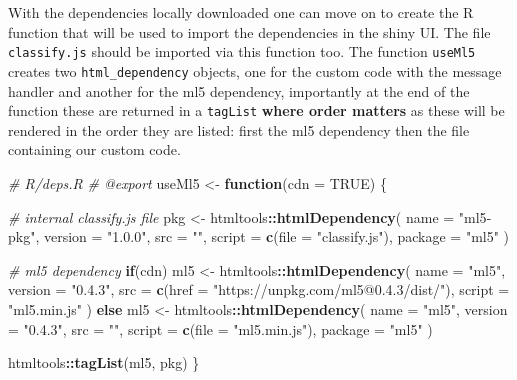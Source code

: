 \documentclass[
]{krantz}
\makeatletter
\newenvironment{Shaded}{\begin{snugshade}}{\end{snugshade}}
\newcommand{\CommentTok}[1]{\textcolor[rgb]{0.37,0.37,0.37}{\textit{#1}}}
\newcommand{\ControlFlowTok}[1]{\textcolor[rgb]{0.27,0.27,0.27}{\textbf{#1}}}
\newcommand{\DataTypeTok}[1]{\textcolor[rgb]{0.27,0.27,0.27}{#1}}
\newcommand{\KeywordTok}[1]{\textcolor[rgb]{0.27,0.27,0.27}{\textbf{#1}}}
\newcommand{\NormalTok}[1]{#1}
\newcommand{\OperatorTok}[1]{\textcolor[rgb]{0.43,0.43,0.43}{\textbf{#1}}}
\newcommand{\OtherTok}[1]{\textcolor[rgb]{0.37,0.37,0.37}{#1}}
\newcommand{\StringTok}[1]{\textcolor[rgb]{0.5,0.5,0.5}{#1}}
\newenvironment{kframe}{%
\medskip{}
\setlength{\fboxsep}{.8em}
 \def\at@end@of@kframe{}%
 \ifinner\ifhmode%
  \def\at@end@of@kframe{\end{minipage}}%
  \begin{minipage}{\columnwidth}%
 \fi\fi%
 \def\FrameCommand##1{\hskip\@totalleftmargin \hskip-\fboxsep
 \colorbox{shadecolor}{##1}\hskip-\fboxsep
     \hskip-\linewidth \hskip-\@totalleftmargin \hskip\columnwidth}%
 \MakeFramed {\advance\hsize-\width
   \@totalleftmargin\z@ \linewidth\hsize
   \@setminipage}}%
 {\par\unskip\endMakeFramed%
 \at@end@of@kframe}
\renewenvironment{Shaded}{\begin{kframe}}{\end{kframe}}
\makeatother
\begin{document}
With the dependencies locally downloaded one can move on to create the R function that will be used to import the dependencies in the shiny UI. The file \texttt{classify.js} should be imported via this function too. The function \texttt{useMl5} creates two \texttt{html\_dependency} objects, one for the custom code with the message handler and another for the ml5 dependency, importantly at the end of the function these are returned in a \texttt{tagList} \textbf{where order matters} as these will be rendered in the order they are listed: first the ml5 dependency then the file containing our custom code.

\begin{Shaded}
\begin{Highlighting}[]
\CommentTok{\# R/deps.R}
\CommentTok{\#\textquotesingle{} @export}
\NormalTok{useMl5 <{-}}\StringTok{ }\ControlFlowTok{function}\NormalTok{(}\DataTypeTok{cdn =} \OtherTok{TRUE}\NormalTok{) \{}

  \CommentTok{\# internal classify.js file}
\NormalTok{  pkg <{-}}\StringTok{ }\NormalTok{htmltools}\OperatorTok{::}\KeywordTok{htmlDependency}\NormalTok{(}
    \DataTypeTok{name =} \StringTok{"ml5{-}pkg"}\NormalTok{,}
    \DataTypeTok{version =} \StringTok{"1.0.0"}\NormalTok{,}
    \DataTypeTok{src =} \StringTok{""}\NormalTok{,}
    \DataTypeTok{script =} \KeywordTok{c}\NormalTok{(}\DataTypeTok{file =} \StringTok{"classify.js"}\NormalTok{),}
    \DataTypeTok{package =} \StringTok{"ml5"}
\NormalTok{  )}

  \CommentTok{\# ml5 dependency}
  \ControlFlowTok{if}\NormalTok{(cdn)}
\NormalTok{    ml5 <{-}}\StringTok{ }\NormalTok{htmltools}\OperatorTok{::}\KeywordTok{htmlDependency}\NormalTok{(}
      \DataTypeTok{name =} \StringTok{"ml5"}\NormalTok{,}
      \DataTypeTok{version =} \StringTok{"0.4.3"}\NormalTok{,}
      \DataTypeTok{src =} \KeywordTok{c}\NormalTok{(}\DataTypeTok{href =} \StringTok{"https://unpkg.com/ml5@0.4.3/dist/"}\NormalTok{),}
      \DataTypeTok{script =} \StringTok{"ml5.min.js"}
\NormalTok{    )}
  \ControlFlowTok{else} 
\NormalTok{    ml5 <{-}}\StringTok{ }\NormalTok{htmltools}\OperatorTok{::}\KeywordTok{htmlDependency}\NormalTok{(}
      \DataTypeTok{name =} \StringTok{"ml5"}\NormalTok{,}
      \DataTypeTok{version =} \StringTok{"0.4.3"}\NormalTok{,}
      \DataTypeTok{src =} \StringTok{""}\NormalTok{,}
      \DataTypeTok{script =} \KeywordTok{c}\NormalTok{(}\DataTypeTok{file =} \StringTok{"ml5.min.js"}\NormalTok{),}
      \DataTypeTok{package =} \StringTok{"ml5"}
\NormalTok{    )}

\NormalTok{  htmltools}\OperatorTok{::}\KeywordTok{tagList}\NormalTok{(ml5, pkg)}
\NormalTok{\}}
\end{Highlighting}
\end{Shaded}
\end{document}

